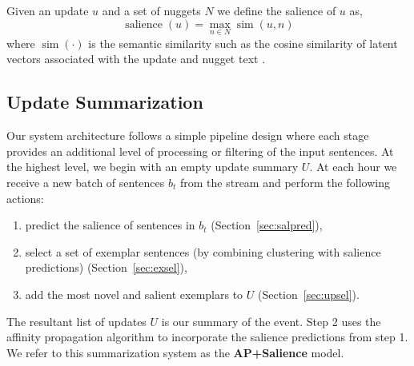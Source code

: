 Given an update $u$ and a set of nuggets $N$ we define the salience of 
$u$ as,
\[\operatorname{salience}(u) = \operatorname{max}_{n \in N} 
\operatorname{sim}(u, n) \]
where $\operatorname{sim}(\cdot)$ is the semantic similarity such as
the cosine similarity of latent vectors associated with the update and 
nugget text \cite{?}. %



\subsection{Update Summarization}

Our system architecture follows a simple pipeline design where each
stage provides an additional level of processing or filtering of the input
sentences.
At the highest level, we begin with an empty update summary $U$.
At each hour we receive a new batch of sentences $b_t$ from the stream
and perform the following actions:
\begin{enumerate}
    \item predict the salience of sentences in $b_t$ (Section~\ref{sec:salpred}),
  \item select a set of exemplar sentences (by combining clustering with 
      salience predictions) (Section~\ref{sec:exsel}),
  \item add the most novel and salient exemplars to $U$ (Section~\ref{sec:upsel}).
\end{enumerate}

The resultant list of updates $U$ is our summary of the event.
Step 2 uses the affinity propagation algorithm to incorporate the salience
predictions from step 1. We refer to this summarization 
system as the \textbf{AP+Salience} model.



